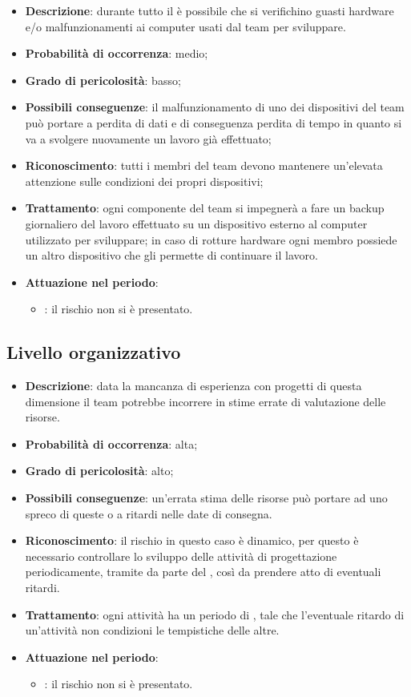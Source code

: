\documentclass[PianoDiProgetto.tex]{subfiles}
\begin{document}
		\begin{itemize}
		\item \textbf{Descrizione}: durante tutto il  è possibile che si verifichino guasti hardware e/o malfunzionamenti  ai computer usati dal team per sviluppare.
		\item \textbf{Probabilità di occorrenza}: medio;
		\item \textbf{Grado di pericolosità}: basso;
		\item \textbf{Possibili conseguenze}: il malfunzionamento di uno dei dispositivi del team può portare a perdita di dati e di conseguenza perdita di tempo in quanto si va a svolgere nuovamente un lavoro già effettuato;
		\item \textbf{Riconoscimento}: tutti i membri del team devono mantenere un'elevata attenzione sulle condizioni dei propri dispositivi;
		\item \textbf{Trattamento}: ogni componente del team si impegnerà a fare un backup giornaliero del lavoro effettuato su un dispositivo esterno al computer utilizzato per sviluppare; in caso di rotture hardware ogni membro possiede un altro dispositivo che gli permette di continuare il lavoro.
		\item \textbf{Attuazione nel periodo}: 
			\begin{itemize}
				\item \ARdoc : il rischio non si è presentato.
			\end{itemize}
	
	\end{itemize}

	\subsection{Livello organizzativo}
		\label{sec:lo}
		\begin{itemize}
		\item \textbf{Descrizione}: data la mancanza di esperienza con progetti di questa dimensione il team potrebbe incorrere in stime errate di valutazione delle risorse.
		\item \textbf{Probabilità di occorrenza}: alta;
		\item \textbf{Grado di pericolosità}: alto;
		\item \textbf{Possibili conseguenze}: un'errata stima delle risorse può portare ad uno spreco di queste o a ritardi nelle date di consegna.
		\item \textbf{Riconoscimento}: il rischio in questo caso è dinamico, per questo è necessario controllare lo sviluppo delle attività di progettazione periodicamente, tramite   da parte del \RESP{}, così da prendere atto di eventuali ritardi.
		\item \textbf{Trattamento}: ogni attività ha un periodo di , tale che l'eventuale ritardo di un'attività non condizioni le tempistiche delle altre.
		\item \textbf{Attuazione nel periodo}: 
			\begin{itemize}
				\item \ARdoc : il rischio non si è presentato.
			\end{itemize}
	\end{itemize}
	
\end{document}
